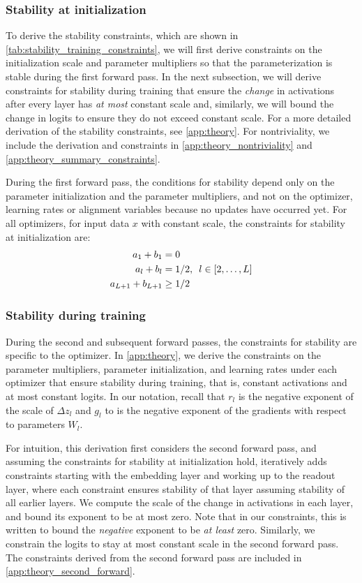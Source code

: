 \documentclass{article}
\theoremstyle{plain}
\theoremstyle{definition}
\theoremstyle{remark}
\newcommand{\hquad}{\hspace{0.5em}}
\begin{document}
\subsubsection{Stability at initialization}
To derive the stability constraints, which are shown in \cref{tab:stability_training_constraints}, we will first derive constraints on the initialization scale and parameter multipliers so that the parameterization is stable during the first forward pass. In the next subsection, we will derive constraints for stability during training that ensure the \emph{change} in activations after every layer has \emph{at most} constant scale and, similarly, we will bound the change in logits to ensure they do not exceed constant scale. For a more detailed derivation of the stability constraints, see \cref{app:theory}. For nontriviality, we include the derivation and constraints in \cref{app:theory_nontriviality} and \ref{app:theory_summary_constraints}.

\label{sec:stability_init}
During the first forward pass, the conditions for stability depend only on the parameter initialization and the parameter multipliers, and not on the optimizer, learning rates or alignment variables because no updates have occurred yet. For all optimizers, for input data $x$ with constant scale, the constraints for stability at initialization are:
\begingroup
\begin{align*}
    a_1 + b_1 &= 0\\
    a_l + b_l &= 1/2, \hquad l \in [2, \ldots, L]\\
    a_{L+1} + b_{L+1} &\geq 1/2
\end{align*}
\endgroup

\subsubsection{Stability during training}
\label{sec:stability_training}
During the second and subsequent forward passes, the constraints for stability are specific to the optimizer. In \cref{app:theory}, we derive the constraints on the parameter multipliers, parameter initialization, and learning rates under each optimizer that ensure stability during training, that is, constant activations and at most constant logits. In our notation, recall that $r_l$ is the negative exponent of the scale of $\Delta z_l$ and $g_l$ to is the negative exponent of the gradients with respect to parameters $W_l$.

For intuition, this derivation first considers the second forward pass, and assuming the constraints for stability at initialization hold, iteratively adds constraints starting with the embedding layer and working up to the readout layer, where each constraint ensures stability of that layer assuming stability of all earlier layers. We compute the scale of the change in activations in each layer, and bound its exponent to be at most zero. Note that in our constraints, this is written to bound the \emph{negative} exponent to be \emph{at least} zero. Similarly, we constrain the logits to stay at most constant scale in the second forward pass. The constraints derived from the second forward pass are included in \cref{app:theory_second_forward}.
\end{document}
